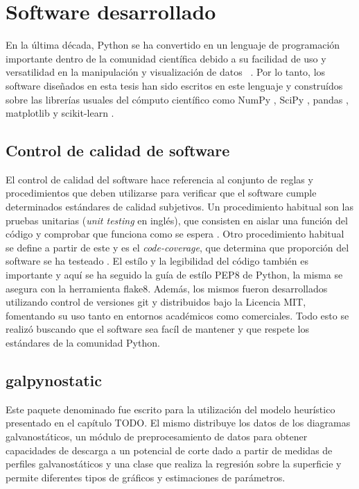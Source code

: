 \chapter{Software desarrollado}

En la última década, Python se ha convertido en un lenguaje de programación 
importante dentro de la comunidad científica debido a su facilidad de uso y 
versatilidad en la manipulación y visualización de datos ~\cite{millman2011}. 
Por lo tanto, los software diseñados en esta tesis han sido escritos en este
lenguaje y construídos sobre las librerías usuales del cómputo científico como
NumPy \cite{numpy}, SciPy \cite{scipy}, pandas \cite{pandas}, 
matplotlib \cite{matplotlib} y scikit-learn \cite{sklearn1, sklearn2}. 


\section{Control de calidad de software}

El control de calidad del software hace referencia al conjunto de reglas y 
procedimientos que deben utilizarse para verificar que el software cumple 
determinados estándares de calidad subjetivos. Un procedimiento habitual son las 
pruebas unitarias (\textit{unit testing} en inglés), que consisten en aislar una 
función del código y comprobar que funciona como se espera \cite{jazayeri2007}. 
Otro procedimiento habitual se define a partir de este y es el 
\textit{code-coverage}, que determina que proporción del software se ha testeado
\cite{miller1963}. El estílo y la legibilidad del código también es importante
y aquí se ha seguido la guía de estílo PEP8 de Python, la misma se asegura con 
la herramienta flake8. Además, los mismos fueron desarrollados utilizando control 
de versiones git y distribuidos bajo la Licencia MIT, fomentando su uso tanto en 
entornos académicos como comerciales. Todo esto se realizó buscando que el 
software sea facíl de mantener y que respete los estándares de la comunidad Python.


\section{galpynostatic}

Este paquete denominado  fue escrito para la utilización
del modelo heurístico presentado en el capítulo TODO. El mismo distribuye los 
datos de los diagramas galvanostáticos, un módulo de preprocesamiento de datos
para obtener capacidades de descarga a un potencial de corte dado a partir de 
medidas de perfiles galvanostáticos y una clase que realiza la regresión sobre la 
superficie y permite diferentes tipos de gráficos y estimaciones de parámetros.

